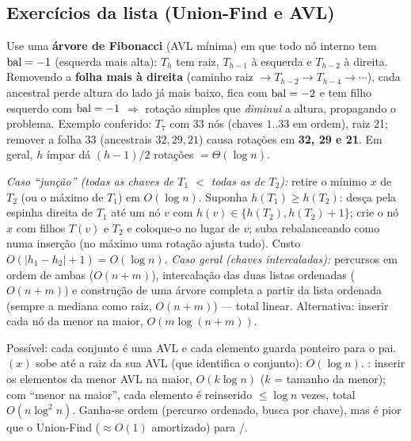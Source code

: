 \subsection{Exercícios da lista (Union-Find e AVL)}
\begin{exemplo}
Use uma \textbf{árvore de Fibonacci} (AVL mínima) em que todo nó interno tem $\operatorname{bal}=-1$ (esquerda mais alta): $T_h$ tem raiz, $T_{h-1}$ à esquerda e $T_{h-2}$ à direita. Removendo a \textbf{folha mais à direita} (caminho raiz $\to T_{h-2}\to T_{h-4}\to\cdots$), cada ancestral perde altura do lado já mais baixo, fica com $\operatorname{bal}=-2$ e tem filho esquerdo com $\operatorname{bal}=-1$ $\Rightarrow$ rotação simples que \emph{diminui} a altura, propagando o problema. Exemplo conferido: $T_7$ com 33 nós (chaves $1..33$ em ordem), raiz 21; remover a folha 33 (ancestrais $32,29,21$) causa rotações em \textbf{32, 29 e 21}. Em geral, $h$ ímpar dá $(h-1)/2$ rotações $=\Theta(\log n)$.
\end{exemplo}
\begin{exemplo}
\emph{Caso ``junção'' (todas as chaves de $T_1$ $<$ todas as de $T_2$):} retire o mínimo $x$ de $T_2$ (ou o máximo de $T_1$) em $O(\log n)$. Suponha $h(T_1)\ge h(T_2)$: desça pela espinha direita de $T_1$ até um nó $v$ com $h(v)\in\{h(T_2),h(T_2)+1\}$; crie o nó $x$ com filhos $T(v)$ e $T_2$ e coloque-o no lugar de $v$; suba rebalanceando como numa inserção (no máximo uma rotação ajusta tudo). Custo $O(|h_1-h_2|+1)=O(\log n)$.
\emph{Caso geral (chaves intercaladas):} percursos em ordem de ambas ($O(n+m)$), intercalação das duas listas ordenadas ($O(n+m)$) e construção de uma árvore completa a partir da lista ordenada (sempre a mediana como raiz, $O(n+m)$) --- total linear. Alternativa: inserir cada nó da menor na maior, $O(m\log(n+m))$.
\end{exemplo}
\begin{exemplo}
Possível: cada conjunto é uma AVL e cada elemento guarda ponteiro para o pai. \Find$(x)$ sobe até a raiz da sua AVL (que identifica o conjunto): $O(\log n)$. \Union: inserir os elementos da menor AVL na maior, $O(k\log n)$ ($k$ = tamanho da menor); com ``menor na maior'', cada elemento é reinserido $\le\log n$ vezes, total $O(n\log^2n)$. Ganha-se ordem (percurso ordenado, busca por chave), mas é pior que o Union-Find ($\approx O(1)$ amortizado) para \Find/\Union.
\end{exemplo}

